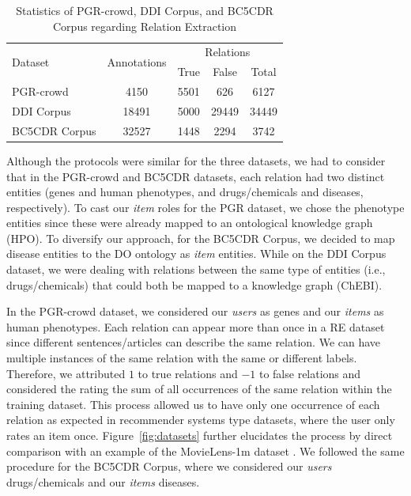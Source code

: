 \begin{table}[h]
\centering
  \caption[Statistics of PGR-crowd, DDI Corpus, and BC5CDR Corpus Regarding Relation Extraction]{Statistics of PGR-crowd, DDI Corpus, and BC5CDR Corpus regarding Relation Extraction}
  \label{tab:dl_statistics}
  \begin{tabular}{lcccc}
    \hline
    \multirow{2}{*}{Dataset} & \multirow{2}{*}{Annotations} & \multicolumn{3}{c}{Relations} \\
    \cline{3-5}
    & & True & False & Total \\
    \hline
    PGR-crowd & 4150 & 5501 & 626 & 6127 \\
    DDI Corpus & 18491 & 5000 & 29449 & 34449 \\
    BC5CDR Corpus & 32527 & 1448 & 2294 & 3742 \\
    \hline
  \end{tabular}
\end{table}

Although the protocols were similar for the three datasets, we had to consider that in the PGR-crowd and BC5CDR datasets, each relation had two distinct entities (genes and human phenotypes, and drugs/chemicals and diseases, respectively). To cast our \textit{item} roles for the PGR dataset, we chose the phenotype entities since these were already mapped to an ontological knowledge graph (HPO). To diversify our approach, for the BC5CDR Corpus, we decided to map disease entities to the DO ontology as \textit{item} entities. While on the DDI Corpus dataset, we were dealing with relations between the same type of entities (i.e., drugs/chemicals) that could both be mapped to a knowledge graph (ChEBI). 

In the PGR-crowd dataset, we considered our \textit{users} as genes and our \textit{items} as human phenotypes. Each relation can appear more than once in a RE dataset since different sentences/articles can describe the same relation. We can have multiple instances of the same relation with the same or different labels. Therefore, we attributed $1$ to true relations and $-1$ to false relations and considered the rating the sum of all occurrences of the same relation within the training dataset. This process allowed us to have only one occurrence of each relation as expected in recommender systems type datasets, where the user only rates an item once. Figure~\ref{fig:datasets} further elucidates the process by direct comparison with an example of the MovieLens-1m dataset \citep{10.1145/2827872}. We followed the same procedure for the BC5CDR Corpus, where we considered our \textit{users} drugs/chemicals and our \textit{items} diseases.

